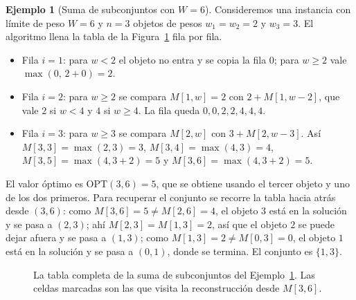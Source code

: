 \documentclass[12pt, spanish, oneside, openany]{book}
\theoremstyle{uprightplain}
\theoremstyle{definition}
\newtheorem{ejemplo}[teorema]{Ejemplo}
\theoremstyle{remark}
\theoremstyle{definition}
\newcommand{\OPT}{\mathrm{OPT}} %
\newcommand{\val}{\operatorname{val}}   %
\begin{document}
\begin{ejemplo}[Suma de subconjuntos con $W=6$]
\label{ej:dp-subset-sum}
Consideremos una instancia con límite de peso $W=6$ y $n=3$ objetos de pesos $w_1=w_2=2$ y $w_3=3$. El algoritmo llena la tabla de la Figura~\ref{fig:dp-subset-sum} fila por fila.
\begin{itemize}
    \item Fila $i=1$: para $w<2$ el objeto no entra y se copia la fila $0$; para $w\ge 2$ vale $\max(0,\,2+0)=2$.
    \item Fila $i=2$: para $w\ge 2$ se compara $M[1,w]=2$ con $2+M[1,w-2]$, que vale $2$ si $w<4$ y $4$ si $w\ge 4$. La fila queda $0,0,2,2,4,4,4$.
    \item Fila $i=3$: para $w\ge 3$ se compara $M[2,w]$ con $3+M[2,w-3]$. Así $M[3,3]=\max(2,3)=3$, $M[3,4]=\max(4,3)=4$, $M[3,5]=\max(4,3+2)=5$ y $M[3,6]=\max(4,3+2)=5$.
\end{itemize}
El valor óptimo es $\OPT(3,6)=5$, que se obtiene usando el tercer objeto y uno de los dos primeros. Para recuperar el conjunto se recorre la tabla hacia atrás desde $(3,6)$: como $M[3,6]=5\ne M[2,6]=4$, el objeto $3$ está en la solución y se pasa a $(2,3)$; ahí $M[2,3]=M[1,3]=2$, así que el objeto $2$ se puede dejar afuera y se pasa a $(1,3)$; como $M[1,3]=2\ne M[0,3]=0$, el objeto $1$ está en la solución y se pasa a $(0,1)$, donde se termina. El conjunto es $\{1,3\}$.
\end{ejemplo}

\begin{figure}[H]
\centering
{}
\caption{La tabla completa de la suma de subconjuntos del
Ejemplo~\ref{ej:dp-subset-sum}. Las celdas marcadas son las que visita la
reconstrucción desde $M[3,6]$.}
\label{fig:dp-subset-sum}
\end{figure}
\end{document}
